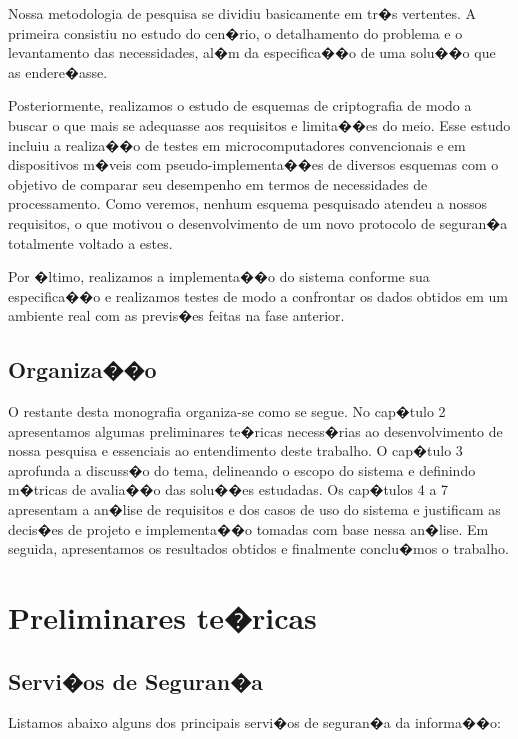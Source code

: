 \documentclass[a4paper,capchap,espacoduplo,normaltoc]{abntepusp}
\begin{document}
Nossa metodologia de pesquisa se dividiu basicamente em tr�s vertentes. A primeira consistiu no estudo do cen�rio, o detalhamento do problema e o levantamento das necessidades, al�m da especifica��o de uma solu��o que as endere�asse. 

Posteriormente, realizamos o estudo de esquemas de criptografia de modo a buscar o que mais se adequasse aos requisitos e limita��es do meio. Esse estudo incluiu a realiza��o de testes em microcomputadores convencionais e em dispositivos m�veis com pseudo-implementa��es de diversos esquemas com o objetivo de comparar seu desempenho em termos de necessidades de processamento. Como veremos, nenhum esquema pesquisado atendeu a nossos requisitos, o que motivou o desenvolvimento de um novo protocolo de seguran�a totalmente voltado a estes.

Por �ltimo, realizamos a implementa��o do sistema conforme sua especifica��o e realizamos testes de modo a confrontar os dados obtidos em um ambiente real com as previs�es feitas na fase anterior.

\section{Organiza��o}
O restante desta monografia organiza-se como se segue. No cap�tulo 2 apresentamos algumas preliminares te�ricas necess�rias ao desenvolvimento de nossa pesquisa e essenciais ao entendimento deste trabalho. O cap�tulo 3 aprofunda a discuss�o do tema, delineando o escopo do sistema e definindo m�tricas de avalia��o das solu��es estudadas. Os cap�tulos 4 a 7 apresentam a an�lise de requisitos e dos casos de uso do sistema e justificam as decis�es de projeto e implementa��o tomadas com base nessa an�lise. Em seguida, apresentamos os resultados obtidos e finalmente conclu�mos o trabalho.

\chapter{Preliminares te�ricas}%

\section{Servi�os de Seguran�a}

Listamos abaixo alguns dos principais servi�os de seguran�a da informa��o:
\end{document}

